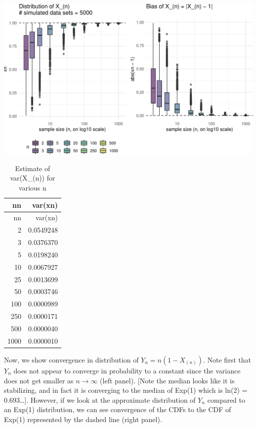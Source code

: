 \documentclass[11pt,]{article}
\newenvironment{Shaded}{\begin{snugshade}}{\end{snugshade}}
\newcommand{\CommentTok}[1]{\textcolor[rgb]{0.56,0.35,0.01}{\textit{#1}}}
\newcommand{\DataTypeTok}[1]{\textcolor[rgb]{0.13,0.29,0.53}{#1}}
\newcommand{\KeywordTok}[1]{\textcolor[rgb]{0.13,0.29,0.53}{\textbf{#1}}}
\newcommand{\NormalTok}[1]{#1}
\newcommand{\OperatorTok}[1]{\textcolor[rgb]{0.81,0.36,0.00}{\textbf{#1}}}
\newcommand{\StringTok}[1]{\textcolor[rgb]{0.31,0.60,0.02}{#1}}
\begin{document}
\begin{center}\includegraphics[width=1\linewidth]{class_notes_files/figure-latex/unnamed-chunk-10-1} \end{center}

\begin{Shaded}
\end{Shaded}

\begin{longtable}[]{@{}rr@{}}
\caption{Estimate of var(X\_(n)) for various n}\tabularnewline
\toprule
nn & var(xn)\tabularnewline
\midrule
\endfirsthead
\toprule
nn & var(xn)\tabularnewline
\midrule
\endhead
2 & 0.0549248\tabularnewline
3 & 0.0376370\tabularnewline
5 & 0.0198240\tabularnewline
10 & 0.0067927\tabularnewline
25 & 0.0013699\tabularnewline
50 & 0.0003746\tabularnewline
100 & 0.0000989\tabularnewline
250 & 0.0000171\tabularnewline
500 & 0.0000040\tabularnewline
1000 & 0.0000010\tabularnewline
\bottomrule
\end{longtable}

Now, we show convergence in distribution of \(Y_n = n(1-X_{(n)})\). Note
first that \(Y_n\) does not appear to converge in probability to a
constant since the variance does not get smaller as \(n\to\infty\) (left
panel). {[}Note the median looks like it is stabilizing, and in fact it
is converging to the median of Exp(1) which is ln(2) = 0.693\ldots{}{]}.
However, if we look at the approximate distribution of \(Y_n\) compared
to an Exp(1) distribution, we can see convergence of the CDFs to the CDF
of Exp(1) represented by the dashed line (right panel).
\end{document}
